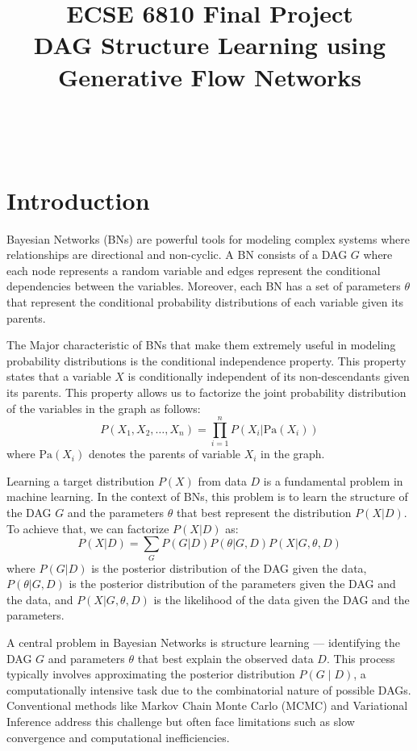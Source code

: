 \documentclass{lxaiproposal}
\title{ECSE 6810 Final Project \\ DAG Structure Learning using Generative Flow Networks}
\author{\coord{Ali}{Najibi}{}\\\\
\coord{\textbf{Course Instructor: Prof. Qiang}}{\textbf{Ji}}{}
}
\begin{document}
    \maketitle
%


    \section{Introduction}
    \vspace*{-3mm}

    Bayesian Networks (BNs) are powerful tools for modeling complex systems where relationships are directional and
    non-cyclic. A BN consists of a DAG $G$ where each node represents a random variable and edges
    represent the conditional dependencies between the variables. Moreover, each BN has a set of parameters $\theta$ that
    represent the conditional probability distributions of each variable given its parents.

    The Major characteristic of BNs that make them extremely useful in modeling probability distributions is the
    conditional independence property. This property states that a variable $X$ is conditionally independent of its
    non-descendants given its parents. This property allows us to factorize the joint probability distribution of the
    variables in the graph as follows:
    \begin{equation}
        P(X_1, X_2, \ldots, X_n) = \prod_{i=1}^{n} P(X_i | \text{Pa}(X_i))
        \label{eq:bn_factorization}
    \end{equation}
    where $\text{Pa}(X_i)$ denotes the parents of variable $X_i$ in the graph.

    Learning a target distribution $P(X)$ from data $D$ is a fundamental problem in machine learning. In the context of
    BNs, this problem is to learn the structure of the DAG $G$ and the parameters $\theta$ that best represent the
    distribution $P(X|D)$. To achieve that, we can factorize $P(X|D)$ as:
    \begin{equation}
        P(X|D) = \sum_{G} P(G|D) P(\theta|G,D) P(X|G,\theta,D)
        \label{eq:bn_learning}
    \end{equation}
    where $P(G|D)$ is the posterior distribution of the DAG given the data, $P(\theta|G,D)$ is the posterior distribution
    of the parameters given the DAG and the data, and $P(X|G,\theta,D)$ is the likelihood of the data given the DAG and
    the parameters.


    A central problem in Bayesian Networks is structure learning — identifying the DAG $G$ and parameters
    $\theta$ that best explain the observed data $D$. This process typically involves approximating the posterior
    distribution $P(G\mid D)$, a computationally intensive task due to the combinatorial nature of
    possible DAGs. Conventional methods like Markov Chain Monte Carlo (MCMC) and Variational Inference address this
    challenge but often face limitations such as slow convergence and computational inefficiencies.
\end{document}
